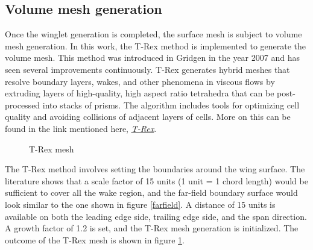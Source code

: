 \subsection{Volume mesh generation}
Once the winglet generation is completed, the surface mesh is subject to volume mesh generation. In this work, the T-Rex method is implemented to generate the volume mesh. This method was introduced in Gridgen in the year 2007 and has seen several improvements continuously. T-Rex generates hybrid meshes that resolve boundary layers, wakes, and other phenomena in viscous flows by extruding layers of high-quality, high aspect ratio tetrahedra that can be post-processed into stacks of prisms. The algorithm includes tools for optimizing cell quality and avoiding collisions of adjacent layers of cells. More on this can be found in the link mentioned here, \href{https://www.pointwise.com/theconnector/2011-July/T-Rex-Hybrid-Meshing-Pointwise.html}{\underline{\textit{T-Rex}}}.

\begin{figure}[!htbp]
    \centering
    \caption{T-Rex mesh}
    \label{T-Rex}
\end{figure}
The T-Rex method involves setting the boundaries around the wing surface. The literature shows that a scale factor of 15 units (1 unit = 1 chord length) would be sufficient to cover all the wake region, and the far-field boundary surface would look similar to the one shown in figure \ref{farfield}. A distance of 15 units is available on both the leading edge side, trailing edge side, and the span direction. A  growth factor of 1.2 is set, and the T-Rex mesh generation is initialized. The outcome of the T-Rex mesh is shown in figure \ref{T-Rex}.

